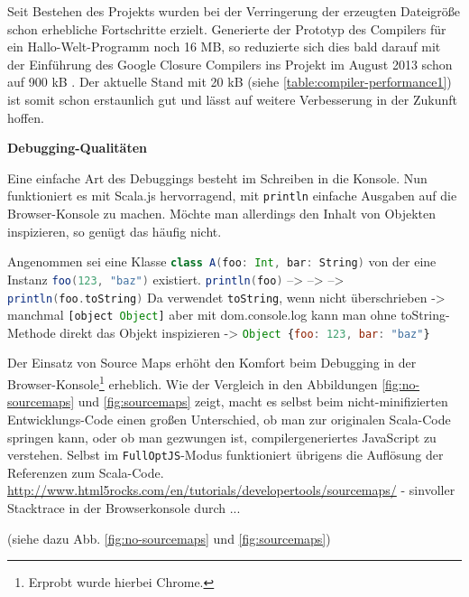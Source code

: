 \documentclass[a4paper, 12pt, hidelinks, listof=totoc, listoftables=totoc, bibliography=totoc]{scrreprt}
\newcommand{\code}[1]{\lstinline[language=Scala, style=inline]|#1|}
\newcommand{\scala}[1]{\lstinline[language=Scala, style=inline]|#1|}
\newcommand{\js}[1]{\lstinline[language=JavaScript, style=inline]|#1|}
\newcommand{\MyMiniSec}[1]{\rmfamily\fontsize{12}{15}\selectfont
	\vspace{7pt}\textbf{#1} %
}
\begin{document}
Seit Bestehen des Projekts wurden bei der Verringerung der erzeugten Dateigröße schon erhebliche Fortschritte erzielt. Generierte der Prototyp des Compilers für ein Hallo-Welt-Programm noch 16 MB, so reduzierte sich dies bald darauf mit der Einführung des Google Closure Compilers ins Projekt im August 2013 schon auf 900 kB \cite[Folie 5 f., Min. 6]{doeraene2014.WHB}. Der aktuelle Stand mit 20 kB (siehe \ref{table:compiler-performance1}) ist somit schon erstaunlich gut und lässt auf weitere Verbesserung in der Zukunft hoffen.

\MyMiniSec{Debugging-Qualitäten}


Eine einfache Art des Debuggings besteht im Schreiben in die Konsole. Nun funktioniert es mit Scala.js hervorragend, mit \scala{println} einfache Ausgaben auf die Browser-Konsole zu machen. Möchte man allerdings den Inhalt von Objekten inspizieren, so genügt das häufig nicht. 

Angenommen sei eine Klasse \scala{class A(foo: Int, bar: String)} von der eine Instanz \scala{foo(123, "baz")} existiert. \scala{println(foo)} --> --> --> \scala{println(foo.toString)}
Da verwendet \scala{toString}, wenn nicht überschrieben -> manchmal \js{[object Object]}
aber mit dom.console.log kann man ohne toString-Methode direkt das Objekt inspizieren -> \js{Object {foo: 123, bar: "baz"}}

Der Einsatz von Source Maps erhöht den Komfort beim Debugging in der Browser-Konsole\footnote{Erprobt wurde hierbei Chrome.} erheblich. Wie der Vergleich in den Abbildungen \ref{fig:no-sourcemaps} und \ref{fig:sourcemaps} zeigt, macht es selbst beim nicht-minifizierten Entwicklungs-Code einen großen Unterschied, ob man zur originalen Scala-Code springen kann, oder ob man gezwungen ist, compilergeneriertes JavaScript zu verstehen. Selbst im \code{FullOptJS}-Modus funktioniert übrigens die Auflösung der Referenzen zum Scala-Code.
\url{http://www.html5rocks.com/en/tutorials/developertools/sourcemaps/}
	- sinvoller Stacktrace in der Browserkonsole durch ...
	
	(siehe dazu Abb. \ref{fig:no-sourcemaps} und \ref{fig:sourcemaps})
\end{document}
